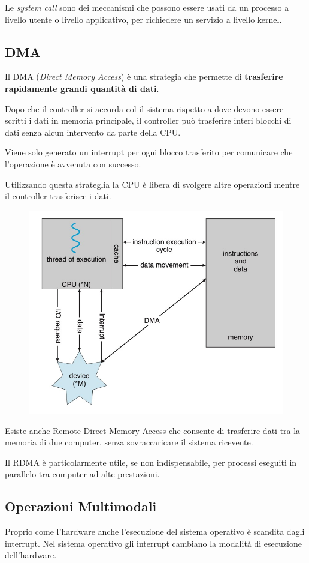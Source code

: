 Le \textit{system call} sono dei meccanismi che possono essere usati da un processo a livello utente o livello applicativo, per richiedere un servizio a livello kernel.


\subsection{DMA}
Il DMA (\textit{Direct Memory Access}) è una strategia che permette di \textbf{trasferire rapidamente grandi quantità di dati}.

\spacer
Dopo che il controller si accorda col il sistema rispetto a dove devono essere scritti i dati in memoria principale, il controller può trasferire interi blocchi di dati senza alcun intervento da parte della CPU.

Viene solo generato un interrupt per ogni blocco trasferito per comunicare che l'operazione è avvenuta con successo.

Utilizzando questa strateglia la CPU è libera di svolgere altre operazioni mentre il controller trasferisce i dati.

\begin{figure}[H]
    \centering
    \includegraphics[width=0.45\linewidth]{assets/DMA.jpg}
\end{figure}

\begin{note}
    Esiste anche Remote Direct Memory Access che consente di trasferire dati tra la memoria di due computer, senza sovraccaricare il sistema ricevente.

    Il RDMA è particolarmente utile, se non indispensabile, per processi eseguiti in parallelo tra computer ad alte prestazioni.
\end{note}

\subsection{Operazioni Multimodali}
Proprio come l'hardware anche l'esecuzione del sistema operativo è scandita dagli interrupt. Nel sistema operativo gli interrupt cambiano la modalità di esecuzione dell'hardware.

